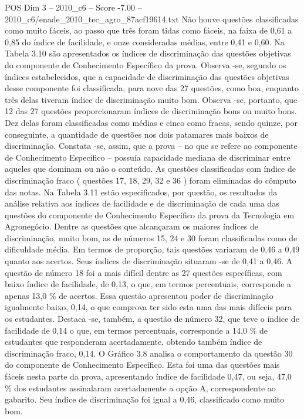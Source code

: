\begin{textsample}{POS Dim 3 – 2010\_c6 – Score -7.00 – 2010\_c6/enade\_2010\_tec\_agro\_87acf19614.txt}
Não houve questões classificadas como muito fáceis, ao passo que três foram tidas como fáceis, na faixa de 0,61 a 0,85 do índice de facilidade, e onze consideradas médias, entre 0,41 e 0,60.
Na Tabela 3.10 são apresentados os índices de discriminação das questões objetivas do componente de Conhecimento Específico da prova.
Observa -se, segundo os índices estabelecidos, que a capacidade de discriminação das questões objetivas desse componente foi classificada, para nove das 27 questões, como boa, enquanto três delas tiveram índice de discriminação muito bom.
Observa -se, portanto, que 12 das 27 questões proporcionaram índices de discriminação bons ou muito bons.
Dez delas foram classificadas como médias e cinco como fracas, sendo quinze, por conseguinte, a quantidade de questões nos dois patamares mais baixos de discriminação.
Constata -se, assim, que a prova – no que se refere ao componente de Conhecimento Específico – possuía capacidade mediana de discriminar entre aqueles que dominam ou não o conteúdo.
As questões classificadas com índice de discriminação fraco ( questões 17, 18, 29, 32 e 36 ) foram eliminadas do cômputo das notas.
Na Tabela 3.11 estão especificados, por questão, os resultados da análise relativa aos índices de facilidade e de discriminação de cada uma das questões do componente de Conhecimento Específico da prova da Tecnologia em Agronegócio.
Dentre as questões que alcançaram os maiores índices de discriminação, muito bom, as de números 15, 24 e 30 foram classificadas como de dificuldade média.
Em termos de proporção, tais questões variaram de 0,46 a 0,49 quanto aos acertos.
Seus índices de discriminação situaram -se de 0,41 a 0,46.
A questão de número 18 foi a mais difícil dentre as 27 questões específicas, com baixo índice de facilidade, de 0,13, o que, em termos percentuais, corresponde a apenas 13,0 \% de acertos.
Essa questão apresentou poder de discriminação igualmente baixo, 0,14, o que comprova ter sido esta uma das mais difíceis para os estudantes.
Destaca -se, também, a questão de número 32, que teve o índice de facilidade de 0,14 o que, em termos percentuais, corresponde a 14,0 \% de estudantes que responderam acertadamente, obtendo também índice de discriminação fraco, 0,14.
O Gráfico 3.8 analisa o comportamento da questão 30 do componente de Conhecimento Específico.
Esta foi uma das questões mais fáceis nesta parte da prova, apresentando índice de facilidade 0,47, ou seja, 47,0 \% dos estudantes assinalaram acertadamente a opção A, correspondente ao gabarito.
Seu índice de discriminação foi igual a 0,46, classificado como muito bom.

\end{textsample}
